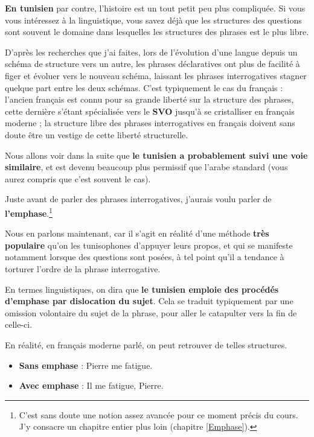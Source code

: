 \textbf{En tunisien} par contre, l'histoire est un tout petit peu plus compliquée. Si vous vous intéressez à la linguistique, vous savez déjà que les structures des questions sont souvent le domaine dans lesquelles les structures des phrases est le plus libre. 

D'après les recherches que j'ai faites, lors de l'évolution d'une langue depuis un schéma de structure vers un autre, les phrases déclaratives ont plus de facilité à figer et évoluer vers le nouveau schéma, laissant les phrases interrogatives stagner quelque part entre les deux schémas. C'est typiquement le cas du français : l'ancien français est connu pour sa grande liberté sur la structure des phrases, cette dernière s'étant spécialisée vers le \textbf{SVO} jusqu'à se cristalliser en français moderne ; la structure libre des phrases interrogatives en français doivent sans doute être un vestige de cette liberté structurelle.

Nous allons voir dans la suite que \textbf{le tunisien a probablement suivi une voie similaire}, et est devenu beaucoup plus permissif que l'arabe standard (vous aurez compris que c'est souvent le cas).

Juste avant de parler des phrases interrogatives, j'aurais voulu parler de \textbf{l'emphase}.\footnote{C'est sans doute une notion assez avancée pour ce moment précis du cours. J'y consacre un chapitre entier plus loin (chapitre \ref{Emphase}).} 

Nous en parlons maintenant, car il s'agit en réalité d'une méthode \textbf{très populaire} qu'on les tunisophones d'appuyer leurs propos, et qui se manifeste notamment lorsque des questions sont posées, à tel point qu'il a tendance à torturer l'ordre de la phrase interrogative. 

En termes linguistiques, on dira que \textbf{le tunisien emploie des procédés d'emphase par dislocation du sujet}. Cela se traduit typiquement par une omission volontaire du sujet de la phrase, pour aller le catapulter vers la fin de celle-ci.

En réalité, en français moderne parlé, on peut retrouver de telles structures. 

\begin{itemize}
    \item \textbf{Sans emphase} : Pierre me fatigue.
    \item \textbf{Avec emphase} : Il me fatigue, Pierre.
\end{itemize}

